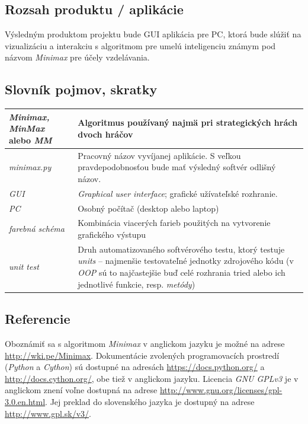 \documentclass{article}
\begin{document}
\subsection{Rozsah produktu / aplikácie}\label{subsec:scope}
Výsledným produktom projektu bude GUI aplikácia pre PC, ktorá bude slúžiť na vizualizáciu a interakciu s algoritmom pre umelú inteligenciu známym pod názvom \emph{Minimax} pre účely vzdelávania.

\subsection{Slovník pojmov, skratky}\label{subsec:dict}
\begin{tabular}{|l|p{24em}|}
	\hline
	\emph{Minimax, MinMax} alebo \emph{MM} &
	Algoritmus používaný najmä pri strategických hrách dvoch hráčov\\
	\hline
	\emph{minimax.py} &
	Pracovný názov vyvíjanej aplikácie. S veľkou pravdepodobnosťou bude mať výsledný softvér odlišný názov. \\
	\hline
	\emph{GUI} &
	\emph{Graphical user interface}; grafické užívateľské rozhranie. \\
	\hline
	\emph{PC} &
	Osobný počítač (desktop alebo laptop) \\
	\hline
	\emph{farebná schéma} &
	Kombinácia viacerých farieb použitých na vytvorenie grafického výstupu \\ 
	\hline
	\emph{unit test} & 
	Druh automatizovaného softvérového testu, ktorý testuje \emph{units} – najmenšie testovateľné jednotky zdrojového kódu (v \emph{OOP} sú to najčastejšie buď celé rozhrania tried alebo ich jednotlivé funkcie, resp. \emph{metódy}) \\
	\hline
\end{tabular}

\subsection{Referencie}\label{subsec:refs}
Oboznámiť sa s algoritmom \emph{Minimax} v anglickom jazyku je možné na adrese \url{http://wki.pe/Minimax}.
Dokumentácie zvolených programovacích prostredí (\emph{Python} a \emph{Cython}) sú dostupné na adresách \url{https://docs.python.org/} a \url{http://docs.cython.org/}, obe tiež v anglickom jazyku.
Licencia \emph{GNU GPLv3} je v anglickom znení voľne dostupná na adrese \url{http://www.gnu.org/licenses/gpl-3.0.en.html}. Jej preklad do slovenského jazyka je dostupný na adrese \url{http://www.gpl.sk/v3/}.
\end{document}
